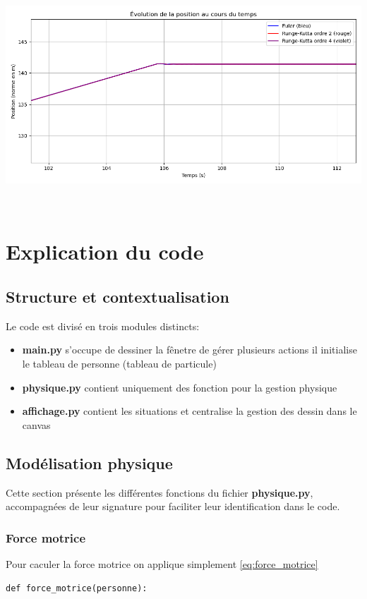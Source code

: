 \documentclass[a4paper,12pt]{article}
\begin{document}
\includegraphics[width=\textwidth]{runge_pos.png}


\
\section{Explication du code}
\subsection{Structure et contextualisation}
\noindent Le code est divisé en trois modules distincts:
\begin{itemize}
	\item \textbf{main.py} s'occupe de dessiner la fênetre de gérer plusieurs actions il initialise le tableau de personne (tableau de particule)
	
	\item \textbf{physique.py} contient uniquement des fonction pour la gestion physique
	
	\item \textbf{affichage.py} contient les situations et centralise la gestion des dessin dans le canvas
\end{itemize}

\subsection{Modélisation physique}
Cette section présente les différentes fonctions du fichier \textbf{physique.py}, accompagnées de leur signature pour faciliter leur identification dans le code.
\subsubsection{Force motrice}

Pour caculer la force motrice on applique simplement \eqref{eq:force_motrice}

\begin{verbatim}
def force_motrice(personne):
\end{verbatim}
\end{document}
